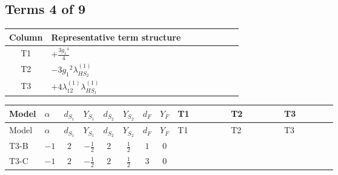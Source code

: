 \documentclass[8pt]{article}
\begin{document}
\begin{landscape}
\subsection*{Terms 4 of 9}
\begin{center}
\begin{tabular}{@{}c >{\raggedright\arraybackslash}p{0.82\linewidth}@{}}
\toprule
Column & Representative term structure \\
\midrule
T1 & \(\displaystyle +\frac{3 {g_1}^4}{4}\) \\
\midrule
T2 & \(\displaystyle -3 {g_1}^2 {\lambda_{HS_2}^{(1)}}\) \\
\midrule
T3 & \(\displaystyle +4 {\lambda_{12}^{(1)}} {\lambda_{HS_1}^{(1)}}\) \\
\midrule
\bottomrule
\end{tabular}
\end{center}
\smallskip
\tiny
\begin{longtable}{@{}llcccccc >{\raggedright\arraybackslash}p{0.21\linewidth} >{\raggedright\arraybackslash}p{0.21\linewidth} >{\raggedright\arraybackslash}p{0.21\linewidth}@{}}
\toprule
Model & $\alpha$ & $d_{S_1}$ & $Y_{S_1}$ & $d_{S_2}$ & $Y_{S_2}$ & $d_F$ & $Y_F$ & T1 & T2 & T3 \\
\midrule
\endfirsthead
\toprule
Model & $\alpha$ & $d_{S_1}$ & $Y_{S_1}$ & $d_{S_2}$ & $Y_{S_2}$ & $d_F$ & $Y_F$ & T1 & T2 & T3 \\
\midrule
\endhead
T3-B & $-1$ & $2$ & $-\frac{1}{2}$ & $2$ & $\frac{1}{2}$ & $1$ & $0$ & \scriptsize\adjustbox{max width=\linewidth}{$\begin{gathered} +\frac{3 {g_1}^4}{4}\end{gathered}$} & \scriptsize\adjustbox{max width=\linewidth}{$\begin{gathered} -3 {g_1}^2 {\lambda_{HS_2}^{(1)}}\end{gathered}$} & \scriptsize\adjustbox{max width=\linewidth}{$\begin{gathered} +4 {\lambda_{12}^{(1)}} {\lambda_{HS_1}^{(1)}}\end{gathered}$} \\
\midrule
T3-C & $-1$ & $2$ & $-\frac{1}{2}$ & $2$ & $\frac{1}{2}$ & $3$ & $0$ & \scriptsize\adjustbox{max width=\linewidth}{$\begin{gathered} +\frac{3 {g_1}^4}{4}\end{gathered}$} & \scriptsize\adjustbox{max width=\linewidth}{$\begin{gathered} -3 {g_1}^2 {\lambda_{HS_2}^{(1)}}\end{gathered}$} & \scriptsize\adjustbox{max width=\linewidth}{$\begin{gathered} +4 {\lambda_{12}^{(1)}} {\lambda_{HS_1}^{(1)}}\end{gathered}$} \\

\end{longtable}
\end{landscape}
\end{document}
